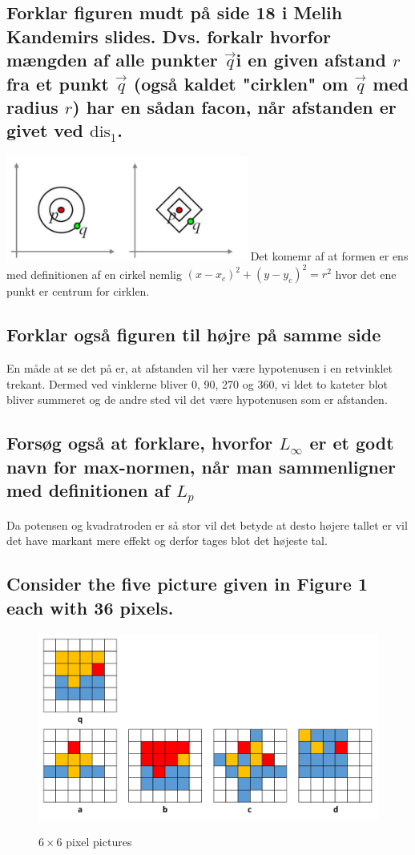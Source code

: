 \documentclass[12pt, a4paper]{article}
\begin{document}
		\subsection{Forklar figuren mudt på side 18 i Melih Kandemirs slides. Dvs. forkalr hvorfor mængden af alle punkter $\vec{q}$i en given afstand $r$ fra et punkt $\vec{q}$ (også kaldet "cirklen" om $\vec{q}$ med radius $r$) har en sådan facon, når afstanden er givet ved $\text{dis}_1$.}
		\includegraphics[width=300px]{images/43,2.png}
			Det komemr af at formen er ens med definitionen af en cirkel nemlig $(x-x_c)^2+(y-y_c)^2=r^2$ hvor det ene punkt er centrum for cirklen.
		\setcounter{subsection}{2}
		\subsection{Forklar også figuren til højre på samme side}
			En måde at se det på er, at afstanden vil her være hypotenusen i en retvinklet trekant. Dermed ved vinklerne bliver 0, 90, 270 og 360, vi ldet to kateter blot bliver summeret og de andre sted vil det være hypotenusen som er afstanden.
		\setcounter{subsection}{2}
		\subsection{Forsøg også at forklare, hvorfor $L_{\infty}$ er et godt navn for max-normen, når man sammenligner med definitionen af $L_p$}
			Da potensen og kvadratroden er så stor vil det betyde at desto højere tallet er vil det have markant mere effekt og derfor tages blot det højeste tal.
		\subsection{Consider the five picture given in Figure 1 each with 36 pixels.}
			\begin{figure}[h]
				\centering
				\includegraphics[width=\linewidth]{images/43,4.png}
				\label{pixelImages}
				\caption{$6\times 6$ pixel pictures}
			\end{figure}
\end{document}

